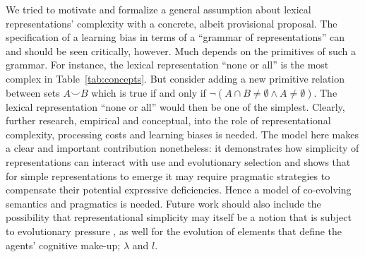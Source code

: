 \documentclass[a4paper, 11pt]{article}
\theoremstyle{Satz}
\begin{document}

We tried to motivate and formalize a general assumption about lexical representations'
complexity with a concrete, albeit provisional proposal. The specification of a learning bias
in terms of a ``grammar of representations'' can and should be seen critically, however. Much
depends on the primitives of such a grammar. For instance, the lexical representation ``none or
all'' is the most complex in Table~\ref{tab:concepts}. But consider adding a new primitive
relation between sets $A \smile B$ which is true if and only if
$\neg(A \cap B \neq \emptyset \wedge A \neq \emptyset)$. The lexical representation ``none or
all'' would then be one of the simplest. Clearly, further research, empirical and conceptual,
into the role of representational complexity, processing costs and learning biases is
needed. The model here makes a clear and important contribution nonetheless: it demonstrates
how simplicity of representations can interact with use and evolutionary selection and shows
that for simple representations to emerge it may require pragmatic strategies to compensate
their potential expressive deficiencies. Hence a model of co-evolving semantics and pragmatics
is needed. Future work should also include the possibility that representational simplicity may
itself be a notion that is subject to evolutionary pressure
\citep[cf.][]{ThompsonKirby2016:Culture-Shapes-}, as well for the evolution of elements that
define the agents' cognitive make-up; $\lambda$ and $l$.
\end{document}
